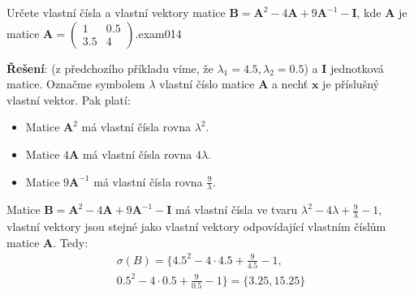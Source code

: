 \begin{mathexam}{Určete vlastní čísla a vlastní vektory matice \(\mathbf{B} = \mathbf{A}^2 -
  4\mathbf{A} + 9\mathbf{A}^{-1} - \mathbf{I}\), kde \(\mathbf{A}\) je matice \(\mathbf{A} = 
  \begin{pmatrix}1&\num{0.5}\\\num{3.5}&4\end{pmatrix}\).}{exam014}

  \textbf{Řešení}: (z předchozího příkladu víme, že \(\lambda_1=4.5, \lambda_2=0.5\)) a
  \(\mathbf{I}\) jednotková matice. Označme symbolem \(\lambda\) vlastní číslo matice \(\mathbf{A}\)
  a nechť \(\mathbf{x}\) je příslušný vlastní vektor. Pak platí:
  \begin{itemize}
    \item Matice \(\mathbf{A}^2\) má vlastní čísla rovna \(\lambda^2\).
    \item Matice \(4\mathbf{A}\) má vlastní čísla rovna \(4\lambda\).
    \item Matice \(9\mathbf{A}^{-1}\) má vlastní čísla rovna \(\frac{9}{\lambda}\).
  \end{itemize}
  Matice \(\mathbf{B}=\mathbf{A}^2-4\mathbf{A}+9\mathbf{A}^{-1}-\mathbf{I}\) má vlastní čísla ve
  tvaru  \(\lambda^2-4\lambda+\frac{9}{\lambda}-1\), vlastní vektory jsou stejné jako vlastní
  vektory odpovídající vlastním číslům matice \(\mathbf{A}\). Tedy:
  \begin{multline*}
      \sigma(B)=\{\num{4.5}^2-4\cdot\num{4.5}+\frac{9}{\num{4.5}}-1,\\
      \num{0.5}^2-4\cdot\num{0.5}+\frac{9}{\num{0.5}}-1\}=\{\num{3.25}, \num{15.25}\}
  \end{multline*}
\end{mathexam}